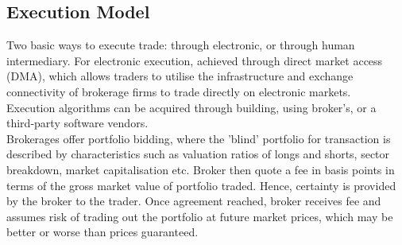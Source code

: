 \subsection{Execution Model}

Two basic ways to execute trade: through electronic, or through human intermediary. For electronic execution, achieved through direct market access (DMA), which allows traders to utilise the infrastructure and exchange connectivity of brokerage firms to trade directly on electronic markets.\\
Execution algorithms can be acquired through building, using broker's, or a third-party software vendors.\\
Brokerages offer portfolio bidding, where the 'blind' portfolio for transaction is described by characteristics such as valuation ratios of longs and shorts, sector breakdown, market capitalisation etc. Broker then quote a fee in basis points in terms of the gross market value of portfolio traded. Hence, certainty is provided by the broker to the trader. Once agreement reached, broker receives fee and assumes risk of trading out the portfolio at future market prices, which may be better or worse than prices guaranteed.

